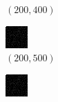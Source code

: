 \documentclass[a4paper, landscape]{article}
\begin{document}
\begin{figure}[H]
\begin{subfigure}{0.09\linewidth}
        \caption*{$(200, 400)$}
    \end{subfigure}
    \begin{subfigure}{0.09\linewidth}
        \centering
        \includegraphics[width=\linewidth]{iht/k = 200, m = 500.png}
        \caption*{$(200, 500)$}
    \end{subfigure}
    \begin{subfigure}{0.09\linewidth}
        \centering
        \includegraphics[width=\linewidth]{iht/k = 200, m = 600.png}

\end{subfigure}
\end{figure}
\end{document}
